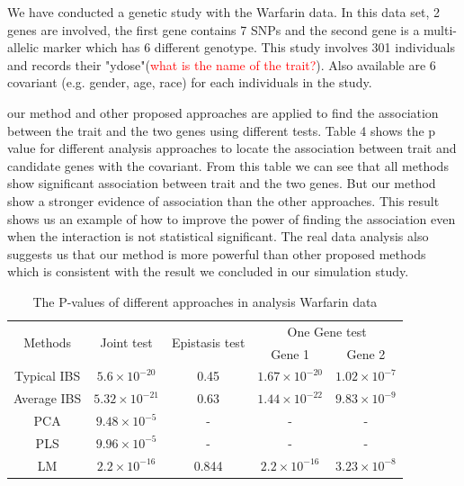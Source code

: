 \documentclass{article}
\begin{document}

    We have conducted a genetic study with the Warfarin data. In this data set, 2 genes are involved, the first gene contains 7 SNPs and the second gene is a multi-allelic marker which has 6 different genotype. This study involves 301 individuals and records their "ydose"(\textcolor{red}{what is the name of the trait?}). Also available are 6 covariant (e.g. gender, age, race) for each individuals in the study. 
    
    our method and other proposed approaches are applied to find the association between the trait and the two genes using different tests. Table 4 shows the p value for different analysis approaches to locate the association between trait and candidate genes with the covariant. From this table we can see that all methods show significant association between trait and the two genes. But our method show a stronger evidence of association than the other approaches. This result shows us an example of how to improve the power of finding the association even when the interaction is not statistical significant. The real data analysis also suggests us that our method is more powerful than other proposed methods which is consistent with the result we concluded in our simulation study.
    
    \begin{table}[htbp]
        \centering
        \caption{The P-values of different approaches in analysis Warfarin data}
        \begin{tabular}{c|cccc}
            \toprule
            \multirow{2}{*}{Methods} & \multirow{2}{*}{Joint test}& \multirow{2}{*}{Epistasis test} & \multicolumn{2}{c}{One Gene test}\\
            &&&Gene 1&Gene 2\\
            \midrule
             Typical IBS &$5.6\times10^{-20}$ & 0.45 &  $1.67\times 10^{-20}$   &   $1.02\times10^{-7}$ \\
             Average IBS &$5.32\times10^{-21}$ & 0.63 &  $1.44\times 10^{-22}$   &   $9.83\times10^{-9}$  \\
             PCA &$9.48\times10^{-5}$ & - &  -   &   -  \\
             PLS &$9.96\times10^{-5}$ & - &  -   &   -  \\
             LM &$2.2\times10^{-16}$ & 0.844 &  $2.2\times 10^{-16}$   &   $3.23\times10^{-8}$  \\
            \bottomrule
        \end{tabular}
    \end{table}
\end{document}
